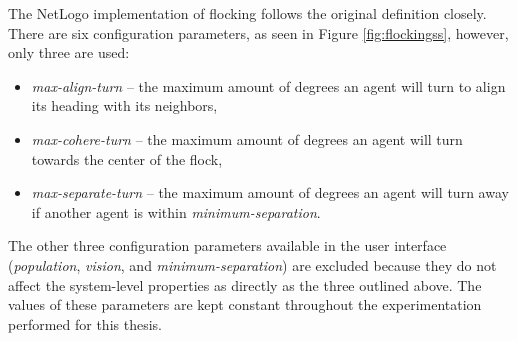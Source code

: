 The NetLogo implementation of flocking follows the original definition closely.
There are six configuration parameters, as seen in Figure \ref{fig:flockingss}, however, only three are used:
\begin{itemize}
\item \textit{max-align-turn} -- the maximum amount of degrees an agent will turn to align its heading with its neighbors,
\item \textit{max-cohere-turn} -- the maximum amount of degrees an agent will turn towards the center of the flock,
\item \textit{max-separate-turn} -- the maximum amount of degrees an agent will turn away if another agent is within \textit{minimum-separation}.
\end{itemize}
The other three configuration parameters available in the user interface (\textit{population}, \textit{vision}, and \textit{minimum-separation}) are excluded because they do not affect the system-level properties as directly as the three outlined above.
The values of these parameters are kept constant throughout the experimentation performed for this thesis.

